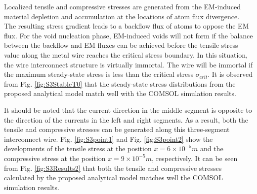 Localized tensile and compressive stresses are generated from the EM-induced material depletion and accumulation at the locations of atom flux divergence. The resulting stress gradient leads to a backflow flux of atoms to oppose the EM flux. For the void nucleation phase, EM-induced voids will not form if the balance between the backflow and EM fluxes can be achieved before the tensile stress value along the metal wire reaches the critical stress boundary. In this situation, the wire interconnect structure is virtually immortal. The wire will be immortal if the maximum steady-state stress is less than the critical stress $\sigma_{crit}$. It is observed from Fig. \ref{fig:S3StableT0} that the steady-state stress distributions from the proposed analytical model match well with the COMSOL simulation results.

It should be noted that the current direction in the middle segment is opposite to the direction of the currents in the left and right segments. As a result, both the tensile and compressive stresses can be generated along this three-segment interconnect wire. Fig. \ref{fig:S3point1} and Fig. \ref{fig:S3point2} show the developments of the tensile stress at the position $x=6\times 10^{-5}m$ and the compressive stress at the position $x=9\times 10^{-5}m$, respectively. It can be seen from Fig. \ref{fig:S3Results2} that both the tensile and compressive stresses calculated by the proposed analytical model matches well the COMSOL simulation results.


